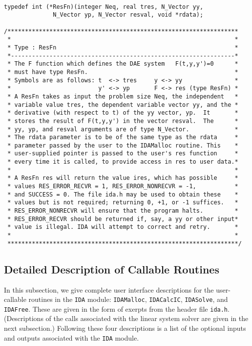 \documentclass[11pt]{article}
\begin{document}
\small
\begin{verbatim}

typedef int (*ResFn)(integer Neq, real tres, N_Vector yy, 
              N_Vector yp, N_Vector resval, void *rdata);
 
/******************************************************************
 *                                                                *
 * Type : ResFn                                                   *
 *----------------------------------------------------------------*        
 * The F function which defines the DAE system   F(t,y,y')=0      *
 * must have type ResFn.                                          *
 * Symbols are as follows: t  <-> tres     y <-> yy               *
 *                         y' <-> yp       F <-> res (type ResFn) *
 * A ResFn takes as input the problem size Neq, the independent   *
 * variable value tres, the dependent variable vector yy, and the *
 * derivative (with respect to t) of the yy vector, yp.  It       *
 * stores the result of F(t,y,y') in the vector resval.  The      *
 * yy, yp, and resval arguments are of type N_Vector.             *
 * The rdata parameter is to be of the same type as the rdata     *
 * parameter passed by the user to the IDAMalloc routine. This    *
 * user-supplied pointer is passed to the user's res function     *
 * every time it is called, to provide access in res to user data.*
 *                                                                *
 * A ResFn res will return the value ires, which has possible     *
 * values RES_ERROR_RECVR = 1, RES_ERROR_NONRECVR = -1,           *
 * and SUCCESS = 0. The file ida.h may be used to obtain these    *
 * values but is not required; returning 0, +1, or -1 suffices.   *
 * RES_ERROR_NONRECVR will ensure that the program halts.         *
 * RES_ERROR_RECVR should be returned if, say, a yy or other input*
 * value is illegal. IDA will attempt to correct and retry.       *
 *                                                                *
 ******************************************************************/

\end{verbatim}
\normalsize


\subsection{Detailed Description of Callable Routines}

In this subsection, we give complete user interface descriptions for
the user-callable routines in the {\tt IDA} module: {\tt IDAMalloc},
{\tt IDACalcIC}, {\tt IDASolve}, and {\tt IDAFree}.  These are given
in the form of exerpts from the header file {\tt ida.h}.  
(Descriptions of the calls associated with the linear system solver
are given in the next subsection.)  Following these four descriptions
is a list of the optional inputs and outputs associated with the 
{\tt IDA} module.
\end{document}
